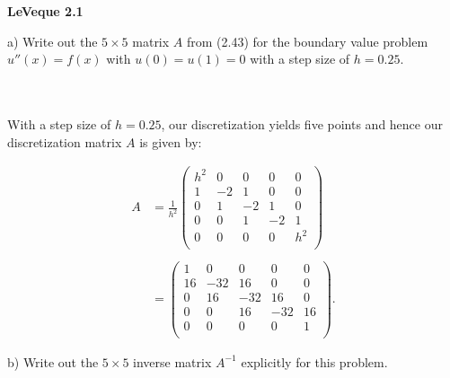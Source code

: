 \textbf{LeVeque 2.1} 

a) Write out the $5 \times 5$ matrix $A$ from (2.43) for the boundary value problem \linebreak $u''(x) = f(x)$ with 
   $u(0) = u(1) = 0$ with a step size of $h = 0.25$.

\begin{solution}\ \\\\
    With a step size of $h = 0.25$, our discretization yields five points and hence our discretization matrix $A$ is 
    given by:

    \begin{align*}
        A &= \frac{1}{h^2}
        \begin{pmatrix}
         h^2 &  0 &  0 &  0 &   0 \\
           1 & -2 &  1 &  0 &   0 \\
           0 &  1 & -2 &  1 &   0 \\
           0 &  0 &  1 & -2 &   1 \\
           0 &  0 &  0 &  0 & h^2 \\
        \end{pmatrix} \\\\
        &= 
        \begin{pmatrix}
             1 &   0 &   0  &   0 &  0 \\
            16 & -32 &  16  &   0 &  0 \\
             0 &  16 & -32  &  16 &  0 \\
             0 &   0 &  16  & -32 & 16 \\
             0 &   0 &   0  &   0 &  1 \\
        \end{pmatrix}.
    \end{align*}
\end{solution}

\pagebreak
b) Write out the $5 \times 5$ inverse matrix $A^{-1}$ explicitly for this problem.

